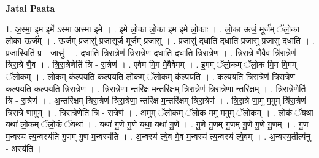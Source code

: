 \documentclass[17pt]{extarticle}
\begin{document}
\textbf{Jatai Paata} \newline

1. अ॒स्मा॒ इ॒म इ॒मे᳚ ऽस्मा अस्मा इ॒मे । . इ॒मे लो॒का लो॒का इ॒म इ॒मे लो॒काः । . लो॒का ऊर्ज॒ मूर्ज॑म् ॅलो॒का लो॒का ऊर्ज᳚म् । . ऊर्ज॑म् प्र॒जासु॑ प्र॒जासूर्ज॒ मूर्ज॑म् प्र॒जासु॑ । . प्र॒जासु॑ दधाति दधाति प्र॒जासु॑ प्र॒जासु॑ दधाति । . प्र॒जास्विति॑ प्र - जासु॑ । . द॒धा॒ति॒ त्रि॒रा॒त्रेण॑ त्रिरा॒त्रेण॑ दधाति दधाति त्रिरा॒त्रेण॑ । . त्रि॒रा॒त्रे णै॒वैव त्रि॑रा॒त्रेण॑ त्रिरा॒त्रे णै॒व । . त्रि॒रा॒त्रेणेति॑ त्रि - रा॒त्रेण॑ । . ए॒वेम मि॒म मे॒वैवेमम् । . इ॒मम् ॅलो॒कम् ॅलो॒क मि॒म मि॒मम् ॅलो॒कम् । . लो॒कम् क॑ल्पयति कल्पयति लो॒कम् ॅलो॒कम् क॑ल्पयति । . क॒ल्प॒य॒ति॒ त्रि॒रा॒त्रेण॑ त्रिरा॒त्रेण॑ कल्पयति कल्पयति त्रिरा॒त्रेण॑ । . त्रि॒रा॒त्रेणा॒ न्तरि॑क्ष म॒न्तरि॑क्षम् त्रिरा॒त्रेण॑ त्रिरा॒त्रेणा॒ न्तरि॑क्षम् । . त्रि॒रा॒त्रेणेति॑ त्रि - रा॒त्रेण॑ । . अ॒न्तरि॑क्षम् त्रिरा॒त्रेण॑ त्रिरा॒त्रेणा॒ न्तरि॑क्ष म॒न्तरि॑क्षम् त्रिरा॒त्रेण॑ । . त्रि॒रा॒त्रे णा॒मु म॒मुम् त्रि॑रा॒त्रेण॑ त्रिरा॒त्रे णा॒मुम् । . त्रि॒रा॒त्रेणेति॑ त्रि - रा॒त्रेण॑ । . अ॒मुम् ॅलो॒कम् ॅलो॒क म॒मु म॒मुम् ॅलो॒कम् । . लो॒कं ॅयथा॒ यथा॑ लो॒कम् ॅलो॒कं ॅयथा᳚ । . यथा॑ गु॒णे गु॒णे यथा॒ यथा॑ गु॒णे । . गु॒णे गु॒णम् गु॒णम् गु॒णे गु॒णे गु॒णम् । . गु॒ण म॒न्वस्य॑ त्य॒न्वस्य॑ति गु॒णम् गु॒ण म॒न्वस्य॑ति । . अ॒न्वस्य॑ त्ये॒व मे॒व म॒न्वस्य॑ त्य॒न्वस्य॑ त्ये॒वम् । . अ॒न्वस्य॒तीत्य॑नु - अस्य॑ति । \newline
\end{document}
